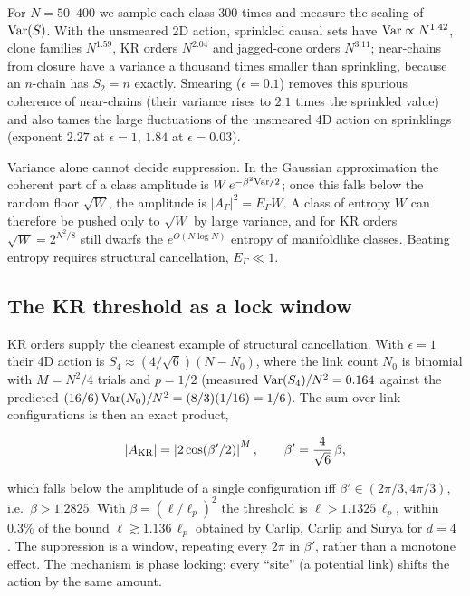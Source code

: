 For \(N=50\)--\(400\) we sample each class 300 times and
measure the scaling of \({\rm Var}(S)\). With the unsmeared
2D action, sprinkled causal sets have
\({\rm Var}\propto N^{1.42}\), clone families \(N^{1.59}\),
KR orders \(N^{2.04}\) and jagged-cone orders \(N^{3.11}\);
near-chains from closure have a variance a thousand times
smaller than sprinkling, because an \(n\)-chain has
\(S_2=n\) exactly. Smearing (\(\epsilon=0.1\)) removes this
spurious coherence of near-chains (their variance rises to
\(2.1\) times the sprinkled value) and also tames the large
fluctuations of the unsmeared 4D action on sprinklings
(exponent \(2.27\) at \(\epsilon=1\), \(1.84\) at
\(\epsilon=0.03\)).

Variance alone cannot decide suppression. In the Gaussian
approximation the coherent part of a class amplitude is
\(W\,e^{-\beta^2{\rm Var}/2}\); once this falls below the
random floor \(\sqrt W\), the amplitude is
\(|A_\Gamma|^2=E_\Gamma W\). A class of entropy \(W\) can
therefore be pushed only to \(\sqrt W\) by large variance,
and for KR orders \(\sqrt W=2^{N^2/8}\) still dwarfs the
\(e^{O(N\log N)}\) entropy of manifoldlike classes. Beating
entropy requires structural cancellation, \(E_\Gamma\ll1\).

\hypertarget{the-kr-threshold-as-a-lock-window}{%
\subsection{The KR threshold as a lock
window}\label{the-kr-threshold-as-a-lock-window}}

KR orders supply the cleanest example of structural
cancellation. With \(\epsilon=1\) their 4D action is
\(S_4\approx(4/\sqrt6)(N-N_0)\), where the link count
\(N_0\) is binomial with \(M=N^2/4\) trials and \(p=1/2\)
(measured \({\rm Var}(S_4)/N^2=0.164\) against the predicted
\((16/6)\,{\rm Var}(N_0)/N^2=(8/3)(1/16)=1/6\)). The sum
over link configurations is then an exact product,

\[|A_{\rm KR}|=\left|2\cos(\beta'/2)\right|^{M},\qquad \beta'=\frac{4}{\sqrt6}\,\beta ,\]

which falls below the amplitude of a single configuration
iff \(\beta'\in(2\pi/3,4\pi/3)\), i.e.~\(\beta>1.2825\).
With \(\beta=(\ell/\ell_p)^2\) the threshold is
\(\ell>1.1325\,\ell_p\), within \(0.3\%\) of the bound
\(\ell\gtrsim1.136\,\ell_p\) obtained by Carlip, Carlip and
Surya for \(d=4\) \cite{CCS23, Carlip24}. The suppression
is a window, repeating every \(2\pi\) in \(\beta'\), rather
than a monotone effect. The mechanism is phase locking:
every ``site'' (a potential link) shifts the action by the
same amount.

